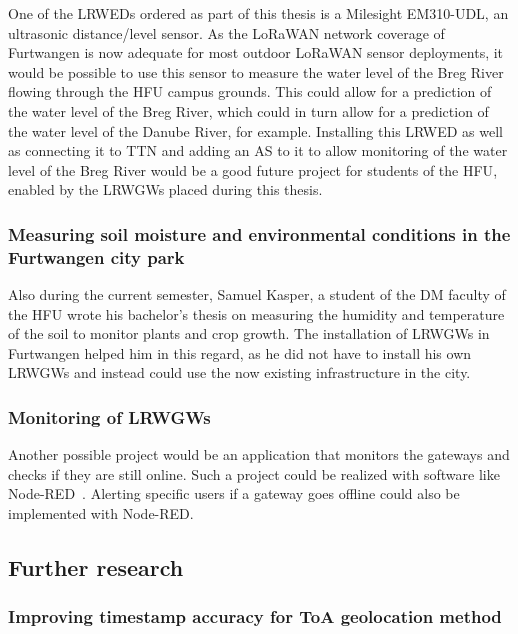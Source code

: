 One of the \aclp{LRWED} ordered as part of this thesis is a Milesight EM310-UDL, an ultrasonic distance/level sensor.
As the \ac{LoRaWAN} network coverage of Furtwangen is now adequate for most outdoor \ac{LoRaWAN} sensor deployments, it would be possible to use this sensor to measure the water level of the Breg River flowing through the \ac{HFU} campus grounds.
This could allow for a prediction of the water level of the Breg River, which could in turn allow for a prediction of the water level of the Danube River, for example.
Installing this \acl{LRWED} as well as connecting it to \ac{TTN} and adding an \ac{AS} to it to allow monitoring of the water level of the Breg River would be a good future project for students of the \ac{HFU}, enabled by the \aclp{LRWGW} placed during this thesis.

\subsubsection{Measuring soil moisture and environmental conditions in the Furtwangen city park}

Also during the current semester, Samuel Kasper, a student of the \ac{DM} faculty of the \ac{HFU} wrote his bachelor's thesis on measuring the humidity and temperature of the soil to monitor plants and crop growth.
The installation of \aclp{LRWGW} in Furtwangen helped him in this regard, as he did not have to install his own \aclp{LRWGW} and instead could use the now existing infrastructure in the city.

\subsubsection{Monitoring of \aclp{LRWGW}}

Another possible project would be an application that monitors the gateways and checks if they are still online.
Such a project could be realized with software like Node-RED~\cite{openjs_foundation_node-red_nodate}.
Alerting specific users if a gateway goes offline could also be implemented with Node-RED.

\subsection{Further research}

\subsubsection{Improving timestamp accuracy for \acl{ToA} geolocation method}

